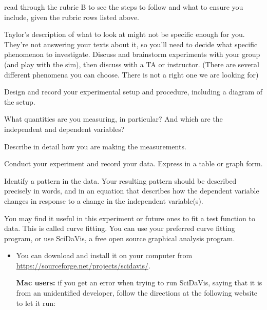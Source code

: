\begin{steps}
	\item read through the rubric B to see the steps to follow and what to ensure you include, given the rubric rows listed above.
	
	\item Taylor's description of what to look at might not be specific enough for you. They're not answering your texts about it, so you'll need to decide what specific phenomenon to investigate. Discuss and brainstorm experiments with your group (and play with the sim), then discuss with a TA or instructor. (There are several different phenomena you can choose. There is not a right one we are looking for)
	
	\item Design and record your experimental setup and procedure, including a diagram of the setup.
	
	\item What quantities are you measuring, in particular? And which are the independent and dependent variables?
	
	\item Describe in detail how you are making the measurements.
	
	\item Conduct your experiment and record your data. Express in a table or graph form.
	
	\item Identify a pattern in the data. Your resulting pattern should be described precisely in words, and in an equation that describes how the dependent variable changes in response to a change in the independent variable(s).
	
	\item You may find it useful in this experiment or future ones to fit a test function to data. This is called curve fitting. You can use your preferred curve fitting program, or use SciDaVis, a free open source graphical analysis program.
	
	\begin{itemize}
		\item You can download and install it on your computer from \url{https://sourceforge.net/projects/scidavis/}.
		
		\begin{framed}
			\textbf{Mac users:} if you get an error when trying to run SciDaVis, saying that it is from an unidentified developer, follow the directions at the following website to let it run:
			

\end{framed}
\end{itemize}
\end{steps}
